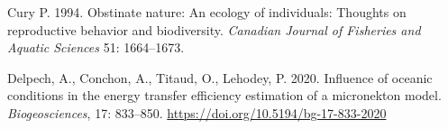 \begin{thebibliography}{}



 Cury P. 1994. Obstinate nature: An ecology of individuals: Thoughts on reproductive behavior and biodiversity. \textit{Canadian Journal of Fisheries and Aquatic Sciences} 51: 1664–1673.


 Delpech, A., Conchon, A., Titaud, O., Lehodey, P. 2020.  Influence of oceanic conditions in the energy transfer efficiency estimation of a micronekton model. \textit{Biogeosciences}, 17: 833–850. \url{https://doi.org/10.5194/bg-17-833-2020}






\end{thebibliography}

